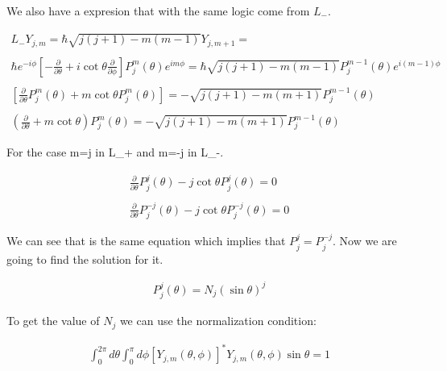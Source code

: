 We also have a expresion that with the same logic come from $L_-$.

\begin{equation}
  \begin{array}{c}
    L_- Y_{j,m} = \hbar \sqrt{j(j+1)-m(m-1)}Y_{j,m+1} =
    \\

    \\
    \hbar e^{-i\phi}\left[-\frac{\partial}{\partial \theta}+i\cot\theta\frac{\partial}{\partial \phi}\right]P_j^m(\theta)e^{im\phi} = \hbar\sqrt{j(j+1)-m(m-1)}P_j^{m-1}(\theta)e^{i(m-1)\phi}
    \\

    \\
    \left[\frac{\partial}{\partial \theta}P_j^m(\theta) +m\cot{\theta}P_j^m(\theta)\right] = -\sqrt{j(j+1)-m(m+1)}P_j^{m-1}(\theta)
    \\

    \\
    \left(\frac{\partial}{\partial\theta}+m\cot\theta\right)P_j^m(\theta) = -\sqrt{j(j+1)-m(m+1)}P_j^{m-1}(\theta)
  \end{array}
\end{equation}

For the case m=j in L_+ and m=-j in L_-.

\begin{equation}
  \begin{array}{c}
    \frac{\partial}{\partial\theta} P_j^j(\theta) - j\cot\theta P_j^j(\theta) = 0
    \\

    \\
    \frac{\partial}{\partial\theta} P_j^{-j}(\theta) - j\cot\theta P_j^{-j}(\theta) = 0
  \end{array}
\end{equation}

We can see that is the same equation which implies that $P_j^j = P_j^{-j}$. Now we are going to find the solution for it.

\begin{equation}
  \begin{array}{c}
    P_j^j(\theta) = N_j (\sin\theta)^j
  \end{array}
\end{equation}

To get the value of $N_j$ we can use the normalization condition:

\begin{equation}
  \begin{array}{c}
    \int_{0}^{2\pi}d\theta\int_{0}^{\pi}d\phi[Y_{j,m}(\theta,\phi)]^*Y_{j,m}(\theta,\phi)\sin\theta = 1
  \end{array}
\end{equation}

